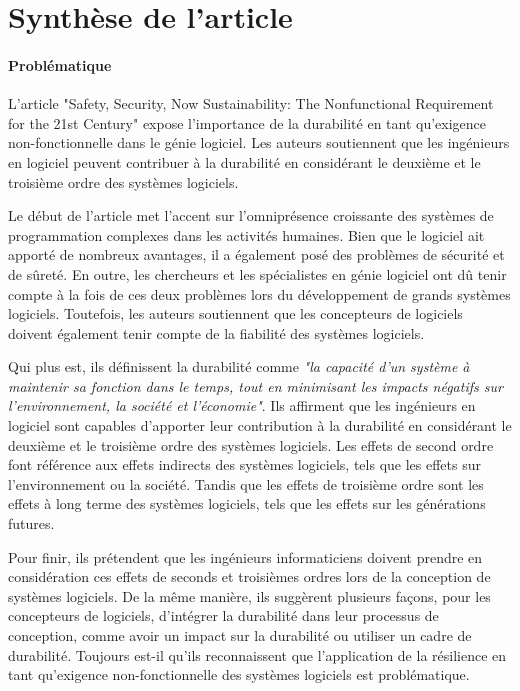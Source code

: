 \section{Synthèse de l'article}

\paragraph{Problématique}
L'article "Safety, Security, Now Sustainability: The Nonfunctional Requirement for the 21st Century" expose l'importance de la durabilité en tant qu'exigence non-fonctionnelle dans le génie logiciel. Les auteurs soutiennent que les ingénieurs en logiciel peuvent contribuer à la durabilité en considérant le deuxième et le troisième ordre des systèmes logiciels.

Le début de l'article met l'accent sur l'omniprésence croissante des systèmes de programmation complexes dans les activités humaines. Bien que le logiciel ait apporté de nombreux avantages, il a également posé des problèmes de sécurité et de sûreté. En outre, les chercheurs et les spécialistes en génie logiciel ont dû tenir compte à la fois de ces deux problèmes lors du développement de grands systèmes logiciels. Toutefois, les auteurs soutiennent que les concepteurs de logiciels doivent également tenir compte de la fiabilité des systèmes logiciels.

Qui plus est, ils définissent la durabilité comme \textit{"la capacité d'un système à maintenir sa fonction dans le temps, tout en minimisant les impacts négatifs sur l'environnement, la société et l'économie"}. Ils affirment que les ingénieurs en logiciel sont capables d'apporter leur contribution à la durabilité en considérant le deuxième et le troisième ordre des systèmes logiciels. Les effets de second ordre font référence aux effets indirects des systèmes logiciels, tels que les effets sur l'environnement ou la société. Tandis que les effets de troisième ordre sont les effets à long terme des systèmes logiciels, tels que les effets sur les générations futures.

Pour finir, ils prétendent que les ingénieurs informaticiens doivent prendre en considération ces effets de seconds et troisièmes ordres lors de la conception de systèmes logiciels. De la même manière, ils suggèrent plusieurs façons, pour les concepteurs de logiciels, d'intégrer la durabilité dans leur processus de conception, comme avoir un impact sur la durabilité ou utiliser un cadre de durabilité. Toujours est-il qu'ils reconnaissent que l'application de la résilience en tant qu'exigence non-fonctionnelle des systèmes logiciels est problématique.

